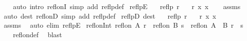 \begin{isabellebody}
%
\isadelimproof
\ \ %
\endisadelimproof
%
\isatagproof
{}\isamarkupfalse%
\ {\isacharparenleft}{\kern0pt}auto\ intro{\isacharcolon}{\kern0pt}\ refl{\isacharunderscore}{\kern0pt}onI\ simp\ add{\isacharcolon}{\kern0pt}\ reflp{\isacharunderscore}{\kern0pt}def{\isacharparenright}{\kern0pt}%
\endisatagproof
{\isafoldproof}%
%
\isadelimproof
\isanewline
%
\endisadelimproof
\isanewline
{}\isamarkupfalse%
\ reflpE{\isacharcolon}{\kern0pt}\isanewline
\ \ \ {\isachardoublequoteopen}reflp\ r{\isachardoublequoteclose}\isanewline
\ \ \ {\isachardoublequoteopen}r\ x\ x{\isachardoublequoteclose}\isanewline
%
\isadelimproof
\ \ %
\endisadelimproof
%
\isatagproof
{}\isamarkupfalse%
\ assms\ \isamarkupfalse%
\ {\isacharparenleft}{\kern0pt}auto\ dest{\isacharcolon}{\kern0pt}\ refl{\isacharunderscore}{\kern0pt}onD\ simp\ add{\isacharcolon}{\kern0pt}\ reflp{\isacharunderscore}{\kern0pt}def{\isacharparenright}{\kern0pt}%
\endisatagproof
{\isafoldproof}%
%
\isadelimproof
\isanewline
%
\endisadelimproof
\isanewline
{}\isamarkupfalse%
\ reflpD\ {\isacharbrackleft}{\kern0pt}dest{\isacharquery}{\kern0pt}{\isacharbrackright}{\kern0pt}{\isacharcolon}{\kern0pt}\isanewline
\ \ \ {\isachardoublequoteopen}reflp\ r{\isachardoublequoteclose}\isanewline
\ \ \ {\isachardoublequoteopen}r\ x\ x{\isachardoublequoteclose}\isanewline
%
\isadelimproof
\ \ %
\endisadelimproof
%
\isatagproof
{}\isamarkupfalse%
\ assms\ \isamarkupfalse%
\ {\isacharparenleft}{\kern0pt}auto\ elim{\isacharcolon}{\kern0pt}\ reflpE{\isacharparenright}{\kern0pt}%
\endisatagproof
{\isafoldproof}%
%
\isadelimproof
\isanewline
%
\endisadelimproof
\isanewline
{}\isamarkupfalse%
\ refl{\isacharunderscore}{\kern0pt}on{\isacharunderscore}{\kern0pt}Int{\isacharcolon}{\kern0pt}\ {\isachardoublequoteopen}refl{\isacharunderscore}{\kern0pt}on\ A\ r\ {\isasymLongrightarrow}\ refl{\isacharunderscore}{\kern0pt}on\ B\ s\ {\isasymLongrightarrow}\ refl{\isacharunderscore}{\kern0pt}on\ {\isacharparenleft}{\kern0pt}A\ {\isasyminter}\ B{\isacharparenright}{\kern0pt}\ {\isacharparenleft}{\kern0pt}r\ {\isasyminter}\ s{\isacharparenright}{\kern0pt}{\isachardoublequoteclose}\isanewline
%
\isadelimproof
\ \ %
\endisadelimproof
%
\isatagproof
{}\isamarkupfalse%
\ refl{\isacharunderscore}{\kern0pt}on{\isacharunderscore}{\kern0pt}def\ \isamarkupfalse%
\ blast%
\endisatagproof
{\isafoldproof}%
%
\isadelimproof
\isanewline

\end{isabellebody}
